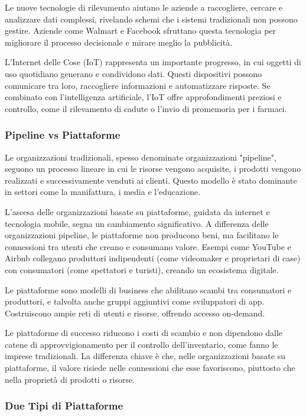 \documentclass{article}
\begin{document}
Le nuove tecnologie di rilevamento aiutano le aziende a raccogliere, cercare e analizzare dati complessi, rivelando schemi che i sistemi tradizionali non possono gestire. Aziende come Walmart e Facebook sfruttano questa tecnologia per migliorare il processo decisionale e mirare meglio la pubblicità.

L'Internet delle Cose (IoT) rappresenta un importante progresso, in cui oggetti di uso quotidiano generano e condividono dati. Questi dispositivi possono comunicare tra loro, raccogliere informazioni e automatizzare risposte. Se combinato con l'intelligenza artificiale, l'IoT offre approfondimenti preziosi e controllo, come il rilevamento di cadute o l'invio di promemoria per i farmaci.


\subsubsection{Pipeline vs Piattaforme}

Le organizzazioni tradizionali, spesso denominate organizzazioni "pipeline", seguono un processo lineare in cui le risorse vengono acquisite, i prodotti vengono realizzati e successivamente venduti ai clienti. Questo modello è stato dominante in settori come la manifattura, i media e l'educazione.

L'ascesa delle organizzazioni basate su piattaforme, guidata da internet e tecnologia mobile, segna un cambiamento significativo. A differenza delle organizzazioni pipeline, le piattaforme non producono beni, ma facilitano le connessioni tra utenti che creano e consumano valore. Esempi come YouTube e Airbnb collegano produttori indipendenti (come videomaker e proprietari di case) con consumatori (come spettatori e turisti), creando un ecosistema digitale.

Le piattaforme sono modelli di business che abilitano scambi tra consumatori e produttori, e talvolta anche gruppi aggiuntivi come sviluppatori di app. Costruiscono ampie reti di utenti e risorse, offrendo accesso on-demand.

Le piattaforme di successo riducono i costi di scambio e non dipendono dalle catene di approvvigionamento per il controllo dell'inventario, come fanno le imprese tradizionali. La differenza chiave è che, nelle organizzazioni basate su piattaforme, il valore risiede nelle connessioni che esse favoriscono, piuttosto che nella proprietà di prodotti o risorse.


\subsubsection{Due Tipi di Piattaforme}
\end{document}
